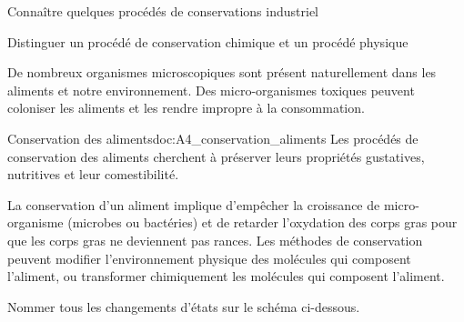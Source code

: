 \teteTermStssAlim

\vspace*{-30pt}


\begin{objectifs}
  \item Connaître quelques procédés de conservations industriel
  \item Distinguer un procédé de conservation chimique et un procédé physique
\end{objectifs}

\begin{contexte}
  De nombreux organismes microscopiques sont présent naturellement dans les aliments et notre environnement.
  Des micro-organismes toxiques peuvent coloniser les aliments et les rendre impropre à la consommation.

\end{contexte}


\begin{doc}{Conservation des aliments}{doc:A4_conservation_aliments}
  Les procédés de conservation des aliments cherchent à préserver leurs propriétés gustatives, nutritives et leur comestibilité.

  La conservation d'un aliment implique d'empêcher la croissance de micro-organisme (microbes ou bactéries) et de retarder l'oxydation des corps gras pour que les corps gras ne deviennent pas rances.
  Les méthodes de conservation peuvent modifier l'environnement physique des molécules qui composent l'aliment, ou transformer chimiquement les molécules qui composent l'aliment.
\end{doc}

\numeroQuestion Nommer tous les changements d'états sur le schéma ci-dessous.

\begin{center}
\end{center}


